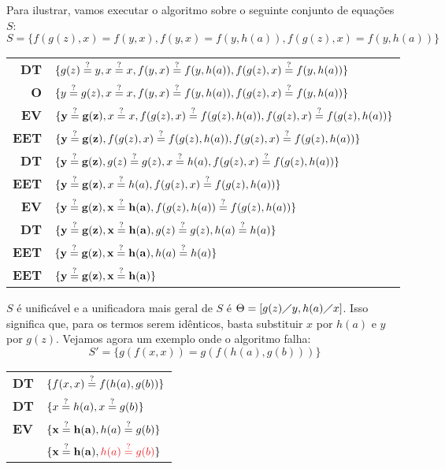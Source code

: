 Para ilustrar, vamos executar o algoritmo sobre o seguinte conjunto de equações $S$:
\[S = \{f(g(z), x) = f(y, x), f(y,x) = f(y,h(a)), f(g(z), x) = f(y, h(a))\}\]
\begin{center}
    \begin{tabular}{r l}
        \textbf{DT} & $\{g(z) \overset{?}{=} y, x \overset{?}{=} x, f(y,x) \overset{?}{=} f(y,h(a)), f(g(z), x) \overset{?}{=} f(y, h(a))\}$ \\
        \textbf{O} & $\{y \overset{?}{=} g(z), x \overset{?}{=} x, f(y,x) \overset{?}{=} f(y,h(a)), f(g(z), x) \overset{?}{=} f(y, h(a))\}$ \\
        \textbf{EV} & $\{\mathbf{y \overset{?}{=} g(z)}, x \overset{?}{=} x, f(g(z),x) \overset{?}{=} f(g(z),h(a)), f(g(z), x) \overset{?}{=} f(g(z), h(a))\}$ \\
        \textbf{EET} & $\{\mathbf{y \overset{?}{=} g(z)}, f(g(z),x) \overset{?}{=} f(g(z),h(a)), f(g(z), x) \overset{?}{=} f(g(z), h(a))\}$ \\
        \textbf{DT} & $\{\mathbf{y \overset{?}{=} g(z)}, g(z) \overset{?}{=} g(z), x \overset{?}{=} h(a), f(g(z), x) \overset{?}{=} f(g(z), h(a))\}$ \\
        \textbf{EET} & $\{\mathbf{y \overset{?}{=} g(z)}, x \overset{?}{=} h(a), f(g(z), x) \overset{?}{=} f(g(z), h(a))\}$ \\
        \textbf{EV} & $\{\mathbf{y \overset{?}{=} g(z)}, \mathbf{x \overset{?}{=} h(a)}, f(g(z), h(a)) \overset{?}{=} f(g(z), h(a))\}$ \\
        \textbf{DT} & $\{\mathbf{y \overset{?}{=} g(z)}, \mathbf{x \overset{?}{=} h(a)}, g(z) \overset{?}{=} g(z), h(a) \overset{?}{=} h(a)\}$ \\
        \textbf{EET} & $\{\mathbf{y \overset{?}{=} g(z)}, \mathbf{x \overset{?}{=} h(a)}, h(a) \overset{?}{=} h(a)\}$ \\
        \textbf{EET} & $\{\mathbf{y \overset{?}{=} g(z)}, \mathbf{x \overset{?}{=} h(a)}\}$ 
    \end{tabular}
\end{center}
$S$ é unificável e a unificadora mais geral de $S$ é $\Theta = [g(z)\diagup y, h(a) \diagup x]$. Isso significa que, para os termos serem idênticos, basta substituir $x$ por $h(a)$ e $y$ por $g(z)$. Vejamos agora um exemplo onde o algoritmo falha:
\[S' = \{g(f(x,x)) = g(f(h(a), g(b)))\}\]
\begin{center}
    \begin{tabular}{l l}
        \textbf{DT} & $\{f(x,x) \overset{?}{=} f(h(a), g(b))\}$ \\
        \textbf{DT} & $\{x \overset{?}{=} h(a), x \overset{?}{=} g(b)\}$ \\
        \textbf{EV} & $\{\mathbf{x \overset{?}{=} h(a)}, h(a) \overset{?}{=} g(b)\}$ \\
        & $\{\mathbf{x \? h(a)}, {\color{Red}h(a) \? g(b)}\}$
    \end{tabular}
\end{center}


